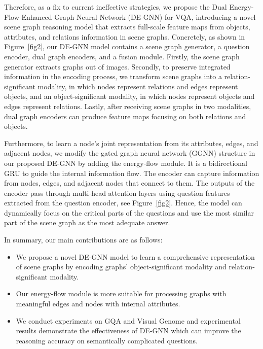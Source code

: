 \documentclass[letterpaper]{article} %
\begin{document}
Therefore, as a fix to current ineffective strategies, we propose the Dual Energy-Flow Enhanced Graph Neural Network (DE-GNN) for VQA, introducing a novel scene graph reasoning model that extracts full-scale feature maps from objects, attributes, and relations information in scene graphs. 
Concretely, as shown in Figure~\ref{fig2}, our DE-GNN model contains a scene graph generator, a question encoder, dual graph encoders, and a fusion module. Firstly, the scene graph generator extracts graphs out of images. Secondly, to preserve integrated information in the encoding process, we transform scene graphs into a relation-significant modality, in which nodes represent relations and edges represent objects, and an object-significant modality, in which nodes represent objects and edges represent relations. Lastly, after receiving scene graphs in two modalities, dual graph encoders can produce feature maps focusing on both relations and objects.

Furthermore, to learn a node's joint representation from its attributes, edges, and adjacent nodes, we modify the gated graph neural network (GGNN) structure in our proposed DE-GNN by adding the energy-flow module. 
It is a  bidirectional GRU to guide the internal information flow.
The encoder can capture information from nodes, edges, and adjacent nodes that connect to them. The outputs of the encoder pass through multi-head attention layers using question features extracted from the question encoder, see Figure~\ref{fig2}. 
Hence, the model can dynamically focus on the critical parts of the questions and use the most similar part of the scene graph as the most adequate answer.

In summary, our main contributions are as follows:%
\begin{itemize}
\setlength{\itemsep}{5pt}
\setlength{\parsep}{5pt}
\setlength{\parskip}{5pt}
\item We propose a novel DE-GNN model to learn a comprehensive representation of scene graphs by encoding graphs' object-significant modality and relation-significant modality.\vspace{-0.06in}

\item Our energy-flow module is more suitable for processing graphs with meaningful edges and nodes with internal attributes.\vspace{-0.06in}

\item We conduct experiments on GQA and Visual Genome and experimental results demonstrate the effectiveness of DE-GNN which can improve the reasoning accuracy on semantically complicated questions.
\end{itemize}\vspace{-0.06in}
\end{document}
